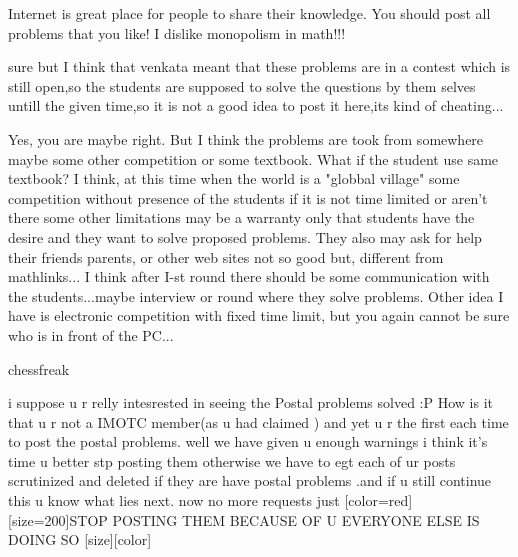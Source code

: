 \begin{solution}
	\begin{tcolorbox}Internet is great place for people to share their knowledge. You should post all problems that you like! I dislike monopolism in math!!!\end{tcolorbox}
sure but I think that venkata meant that these problems are in a contest which is still open,so the students are supposed to solve the questions by them selves untill the given time,so it is not a good idea to post it here,its kind of cheating...
\end{solution}



\begin{solution}
	Yes, you are maybe right. But I think the problems are took from somewhere maybe some other competition or some textbook. What if the student use same textbook? I think, at this time when the world is a "globbal village" some competition without presence of the students if it is not time limited or aren't there some other limitations may be a warranty only that students have the desire and they want to solve proposed problems. They also may ask for help their friends parents, or other web sites not so good but, different from mathlinks... I think after I-st round there should be some communication with the students...maybe interview or round where they solve problems. Other idea I have is electronic competition with fixed time limit, but you again cannot be sure who is in front of the PC...
\end{solution}



\begin{solution}
	\begin{bolded}chessfreak\end{bolded} i suppose u r relly intesrested in seeing the Postal problems solved  :P 
How is it that u r not a IMOTC member(as u had claimed   ) and yet u r the first each time to post the postal problems.
well we have given u enough warnings i think it's time u better stp posting them otherwise we have to egt each of ur posts scrutinized and deleted if they are have postal problems .and if u still continue this u know what lies next.
now no more requests just
[color=red][size=200]STOP POSTING THEM BECAUSE OF U EVERYONE ELSE IS DOING SO [\/size][\/color]
\end{solution}



